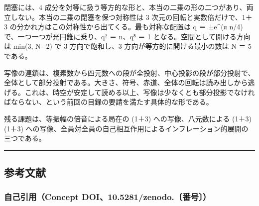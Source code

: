 \documentclass[
  a4paper,
]{ltjsarticle}
\begin{document}
閉塞には、4
成分を対等に扱う等方的な形と、本当の二乗の形の二つがあり、両立しない。本当の二乗の閉塞を保つ対称性は
3 次元の回転と実数倍だけで、1＋3
の分かれ方はこの対称性から出てくる。最も対称な配置は q ＝ ±e\^{}(π n/4)
で、一つ一つが光円錐に乗り、q² ＝ n、q⁸ ＝ 1
となる。空間として開ける方向は min(3, N−2) で 3 方向で飽和し、3
方向が等方的に開ける最小の数は N ＝ 5 である。

写像の連鎖は、複素数から四元数への段が全投射、中心投影の段が部分投射で、全体として部分投射である。大きさ、符号、赤道、全体の回転は読み出しから逃げる。これは、時空が安定して読める以上、写像は少なくとも部分投影でなければならない、という前回の目録の要請を満たす具体的な形である。

残る課題は、等振幅の倍音による局在の (1＋3) への写像、八元数による
(1＋3)(1＋3)
への写像、全員対全員の自己相互作用によるインフレーション的展開の三つである。

\begin{center}\rule{0.5\linewidth}{0.5pt}\end{center}

\subsection{参考文献}\label{ux53c2ux8003ux6587ux732e}

\subsubsection{自己引用（Concept
DOI、10.5281/zenodo.〔番号〕）}\label{ux81eaux5df1ux5f15ux7528concept-doi10.5281zenodo.ux756aux53f7}
\end{document}
